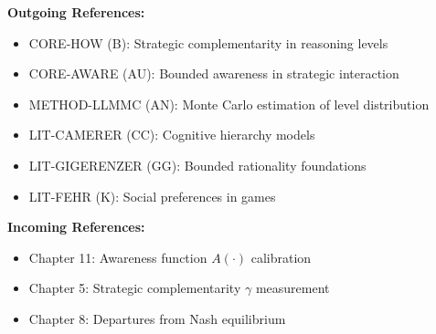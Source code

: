 \begin{tcolorbox}[colback=gray!5!white, colframe=gray!75!black, title=Cross-Reference Map]
\textbf{Outgoing References:}
\begin{itemize}[nosep]
    \item CORE-HOW (B): Strategic complementarity in reasoning levels
    \item CORE-AWARE (AU): Bounded awareness in strategic interaction
    \item METHOD-LLMMC (AN): Monte Carlo estimation of level distribution
    \item LIT-CAMERER (CC): Cognitive hierarchy models
    \item LIT-GIGERENZER (GG): Bounded rationality foundations
    \item LIT-FEHR (K): Social preferences in games
\end{itemize}

\textbf{Incoming References:}
\begin{itemize}[nosep]
    \item Chapter 11: Awareness function $A(\cdot)$ calibration
    \item Chapter 5: Strategic complementarity $\gamma$ measurement
    \item Chapter 8: Departures from Nash equilibrium
\end{itemize}
\end{tcolorbox}



